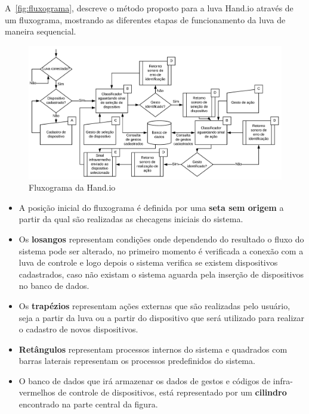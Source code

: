 A~\autoref{fig:fluxograma}, descreve o método proposto para a luva Hand.io através de um fluxograma, mostrando as diferentes etapas de funcionamento da luva de maneira sequencial.

\begin{figure}[ht]
    \centering
	\includegraphics[width=\textwidth, keepaspectratio]{resources/fluxograma.pdf}
	\caption{Fluxograma da Hand.io}
	\label{fig:fluxograma}
\end{figure}

\begin{itemize}
    \item A posição inicial do fluxograma é definida por uma \textbf{seta sem origem} a partir da qual são realizadas as checagens iniciais do sistema.
    \item Os \textbf{losangos} representam condições onde dependendo do resultado o fluxo do sistema pode ser alterado, no primeiro momento é verificada a conexão com a luva de controle e logo depois o sistema verifica se existem dispositivos cadastrados, caso não existam o sistema aguarda pela inserção de dispositivos no banco de dados.
    \item Os \textbf{trapézios} representam ações externas que são realizadas pelo usuário, seja a partir da luva ou a partir do dispositivo que será utilizado para realizar o cadastro de novos dispositivos. 
    \item \textbf{Retângulos} representam processos internos do sistema 
e quadrados com barras laterais representam os processos predefinidos do sistema.
    \item O banco de dados que irá armazenar os dados de gestos e códigos de infra-vermelhos de controle de dispositivos, está representado por um \textbf{cilindro} encontrado na parte central da figura.
\end{itemize}




